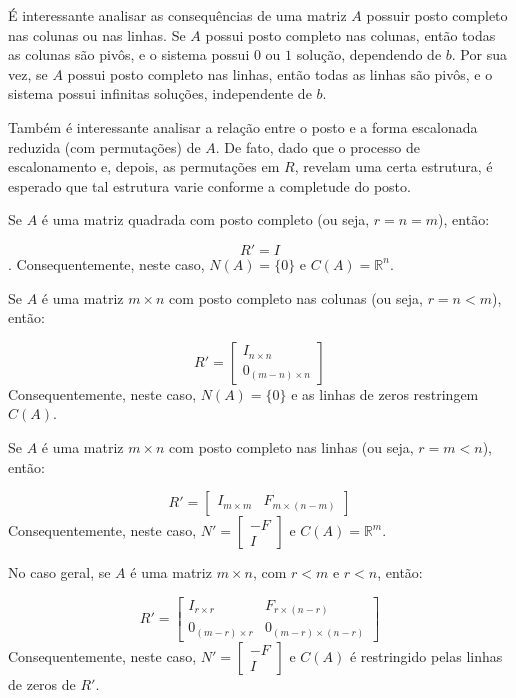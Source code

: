 É interessante analisar as consequências de uma matriz $A$ possuir posto completo nas colunas ou nas linhas. Se $A$ possui posto completo nas colunas, então todas as colunas são pivôs, e o sistema possui $0$ ou $1$ solução, dependendo de $b$. Por sua vez, se $A$ possui posto completo nas linhas, então todas as linhas são pivôs, e o sistema possui infinitas soluções, independente de $b$.

Também é interessante analisar a relação entre o posto e a forma escalonada reduzida (com permutações) de $A$. De fato, dado que o processo de escalonamento e, depois, as permutações em $R$, revelam uma certa estrutura, é esperado que tal estrutura varie conforme a completude do posto.

Se $A$ é uma matriz quadrada com posto completo (ou seja, $r = n = m$), então:

$$
R' = I
$$.
Consequentemente, neste caso, $N(A) = \{0\}$ e $C(A) = \mathbb{R}^n$.

Se $A$ é uma matriz $m\times n$ com posto completo nas colunas (ou seja, $r = n < m$), então:

$$
R' = \begin{bmatrix}
	I_{n\times n} \\
	0_{(m - n)\times n}
\end{bmatrix}
$$
Consequentemente, neste caso, $N(A) = \{0\}$ e as linhas de zeros restringem $C(A)$.

Se $A$ é uma matriz $m\times n$ com posto completo nas linhas (ou seja, $r = m < n$), então:

$$
R' = \begin{bmatrix}
	I_{m\times m} & F_{m\times(n - m)}
\end{bmatrix}
$$
Consequentemente, neste caso, $N' = \begin{bmatrix}
	-F \\
	I
\end{bmatrix}$ e $C(A) = \mathbb{R}^m$.

No caso geral, se $A$ é uma matriz $m\times n$, com $r < m$ e $r < n$, então:

$$
R' = \begin{bmatrix}
	I_{r\times r} & F_{r\times(n - r)} \\
	0_{(m - r)\times r} & 0_{(m - r)\times(n - r)}
\end{bmatrix}
$$
Consequentemente, neste caso, $N' = \begin{bmatrix}
	-F \\
	I
\end{bmatrix}$ e $C(A)$ é restringido pelas linhas de zeros de $R'$.

